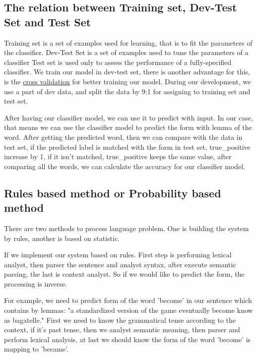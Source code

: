 \documentclass[a4paper]{article}
\begin{document}
\subsection{The relation between Training set, Dev-Test Set and Test Set}
Training set is a set of examples used for learning, that is to fit the parameters of the classifier. Dev-Test Set is a set of examples used to tune the parameters of a classifier Test set is used only to assess the performance of a fully-specified classifier.\cite{ripley_pattern_2007} We train our model in dev-test set, there is another advantage for this, is the \href{https://en.wikipedia.org/wiki/Cross-validation_(statistics)}{cross validation} for better training our model. During our development, we use a part of dev data, and split the data by 9:1 for assigning to training set and test set.

After having our classifier model, we can use it to predict with input. In our case, that means we can use the classifier model to predict the form with lemma of the word. After getting the predicted word, then we can compare with the data in test set, if the predicted label is matched with the form in test set, true\_positive increase by 1, if it isn't matched, true\_positive keeps the same value, after comparing all the words, we can calculate the accuracy for our classifier model. 

\subsection{Rules based method or Probability based method}

There are two methods to process language problem. One is building the system by rules, another is based on statistic.

If we implement our system based on rules. First step is performing lexical analyst, then parser the sentence and analyst syntax, after execute semantic parsing, the last is context analyst. So if we would like to predict the form, the processing is inverse. 

For example, we need to predict form of the word 'become' in our sentence which contains by lemmas: "a standardized version of the game eventually become know as bagatelle."
First we need to know the grammatical tense according to the context, if it's past tense, then we analyst semantic meaning, then parser and perform lexical analysis, at last we should know the form of the word 'become' is mapping to 'became'.
\end{document}
